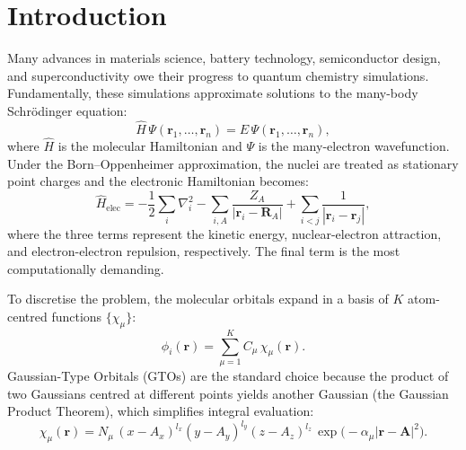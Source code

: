 \documentclass[12pt,a4paper]{article}
\begin{document}
\newpage
\tableofcontents
\newpage

\section{Introduction}
\label{sec:intro}

Many advances in materials science, battery technology, semiconductor design, and superconductivity owe their progress to quantum chemistry simulations. Fundamentally, these simulations approximate solutions to the many-body Schr\"{o}dinger equation:
\begin{equation}
 \hat{H}\,\Psi(\mathbf{r}_1, \ldots, \mathbf{r}_n) = E\,\Psi(\mathbf{r}_1, \ldots, \mathbf{r}_n),
    \label{eq:schrodinger}
\end{equation}
where $\hat{H}$ is the molecular Hamiltonian and $\Psi$ is the many-electron wavefunction. Under the Born--Oppenheimer approximation, the nuclei are treated as stationary point charges and the electronic Hamiltonian becomes:
\begin{equation}
 \hat{H}_{\text{elec}} = -\frac{1}{2}\sum_i \nabla_i^2
 - \sum_{i,A}\frac{Z_A}{|\mathbf{r}_i - \mathbf{R}_A|}
 + \sum_{i<j}\frac{1}{|\mathbf{r}_i - \mathbf{r}_j|},
    \label{eq:helec}
\end{equation}
where the three terms represent the kinetic energy, nuclear-electron attraction, and electron-electron repulsion, respectively. The final term is the most computationally demanding.

To discretise the problem, the molecular orbitals expand in a basis of $K$ atom-centred functions $\{\chi_\mu\}$:
\begin{equation}
    \phi_i(\mathbf{r}) = \sum_{\mu=1}^{K} C_\mu\,\chi_\mu(\mathbf{r}).
    \label{eq:lcao}
\end{equation}
Gaussian-Type Orbitals (GTOs) are the standard choice because the product of two Gaussians centred at different points yields another Gaussian (the Gaussian Product Theorem), which simplifies integral evaluation:
\begin{equation}
    \chi_\mu(\mathbf{r}) = N_\mu\,(x - A_x)^{l_x}(y - A_y)^{l_y}(z - A_z)^{l_z}\,\exp\!\bigl(-\alpha_\mu |\mathbf{r} - \mathbf{A}|^2\bigr).
    \label{eq:gto}
\end{equation}
\end{document}
